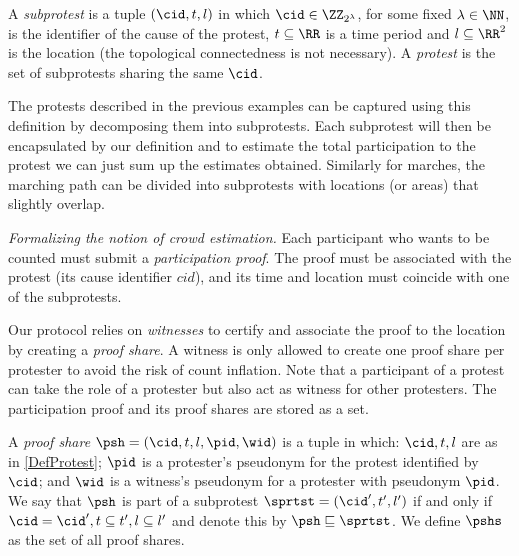 \begin{definition}\label{DefProtest}
  A \emph{subprotest} is a tuple \((\cid, t, l)\) in which \(\cid\in 
    \ZZ_{2^\lambda}\), for some fixed \(\lambda\in \NN\), is the identifier of 
  the cause of the protest,
  \(t \subseteq \RR\) is a time period and \(l \subseteq \RR^2\) is the location (the topological connectedness is not necessary).
  A \emph{protest} is the set of subprotests sharing the same \(\cid\).
\end{definition}

The protests described in the previous examples can be captured using this definition by decomposing them into subprotests.
Each subprotest will then be encapsulated by our definition and to estimate the total participation to the protest we can just sum up the estimates obtained.
Similarly for marches, the marching path can be divided into subprotests with locations (or areas) that slightly overlap.

\emph{Formalizing the notion of crowd estimation.} 
Each participant who wants to be counted must submit a \emph{participation proof}.
The proof must be associated with the protest (\ie its cause identifier \(cid\)), and its time and location must coincide with one of the subprotests.

Our protocol relies on \emph{witnesses} to certify and associate the proof to the location by creating a \emph{proof share}.
A witness is only allowed to create one proof share per protester to avoid the risk of count inflation.
Note that a participant of a protest can take the role of a protester but also act as witness for other protesters.
The participation proof and its proof shares are stored as a set.


\begin{definition}%
  \label{DefProofShare}\label{DefProofShares}
  A \emph{proof share} \(\psh = (\cid, t, l, \pid, \wid)\) is a tuple in which: 
  \(\cid, t, l\) are as in \cref{DefProtest};
  \(\pid\) is a protester's pseudonym for the protest identified by \(\cid\); and \(\wid\) is a witness's pseudonym for a protester with pseudonym \(\pid\).
  We say that \(\psh\) is part of a subprotest \(\sprtst = (\cid', t', l')\) if and only if \(\cid = \cid', t\subseteq t', l\subseteq l'\) and denote this by 
  \(\psh \sqsubseteq \sprtst\).
  We define \(\pshs\) as the set of all proof shares.
\end{definition}

